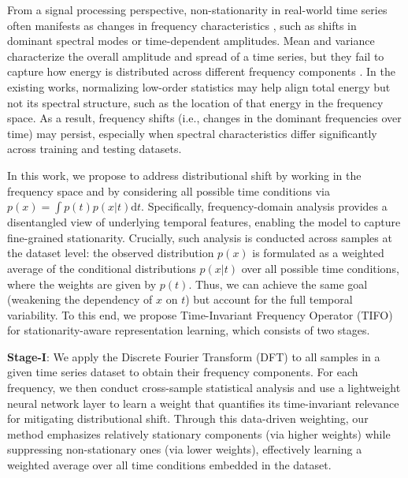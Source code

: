 \documentclass[sigconf,anonymous,review]{acmart}
\newcommand{\methodn}{\textsc{TIFO}}
\newcommand{\method}{\textsc{\methodn}\xspace}
\begin{document}
From a signal processing perspective, non-stationarity in real-world time series often manifests as changes in frequency characteristics \citep{Digital_Signal_Processing}, such as shifts in dominant spectral modes or time-dependent amplitudes.
Mean and variance characterize the overall amplitude and spread of a time series, but they fail to capture how energy is distributed across different frequency components \citep{Piao2024fredformer}. 
In the existing works, normalizing low-order statistics may help align total energy but not its spectral structure, such as the location of that energy in the frequency space.
As a result, frequency shifts (i.e., changes in the dominant frequencies over time) may persist, especially when spectral characteristics differ significantly across training and testing datasets.




In this work, we propose to address distributional shift by working in the frequency space and by considering all possible time conditions via $p(x) = \int p(t) p(x|t) \mathrm{d}t$.
Specifically, frequency-domain analysis provides a disentangled view of underlying temporal features, enabling the model to capture fine-grained stationarity.
Crucially, such analysis is conducted across samples at the dataset level: the observed distribution $p(x)$ is formulated as a weighted average of the conditional distributions $p(x|t)$ over all possible time conditions, where the weights are given by $p(t)$.
Thus, we can achieve the same goal (weakening the dependency of $x$ on $t$) but account for the full temporal variability.
To this end, we propose Time-Invariant Frequency Operator (\method) for stationarity-aware representation learning, which consists of two stages.

\textbf{Stage-I}: We apply the Discrete Fourier Transform (DFT) to all samples in a given time series dataset to obtain their frequency components. 
For each frequency, we then conduct cross-sample statistical analysis and use a lightweight neural network layer to learn a weight that quantifies its time-invariant relevance for mitigating distributional shift.
Through this data-driven weighting, our method emphasizes relatively stationary components (via higher weights) while suppressing non-stationary ones (via lower weights), effectively learning a weighted average over all time conditions embedded in the dataset.
\end{document}
